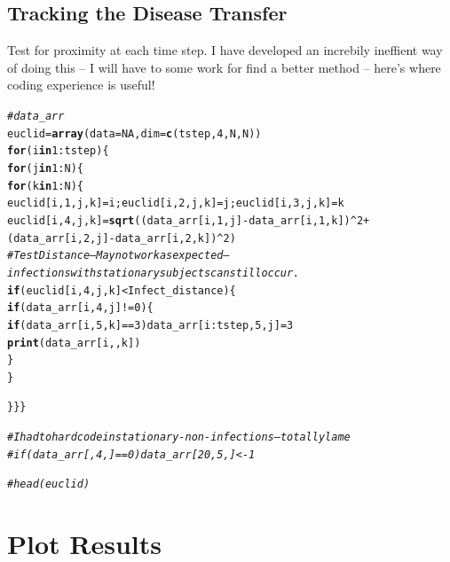 \documentclass{article}\usepackage[]{graphicx}\usepackage[]{color}
\makeatletter
\newcommand{\hlnum}[1]{\textcolor[rgb]{0.686,0.059,0.569}{#1}}%
\newcommand{\hlcom}[1]{\textcolor[rgb]{0.678,0.584,0.686}{\textit{#1}}}%
\newcommand{\hlopt}[1]{\textcolor[rgb]{0,0,0}{#1}}%
\newcommand{\hlstd}[1]{\textcolor[rgb]{0.345,0.345,0.345}{#1}}%
\newcommand{\hlkwa}[1]{\textcolor[rgb]{0.161,0.373,0.58}{\textbf{#1}}}%
\newcommand{\hlkwb}[1]{\textcolor[rgb]{0.69,0.353,0.396}{#1}}%
\newcommand{\hlkwc}[1]{\textcolor[rgb]{0.333,0.667,0.333}{#1}}%
\newcommand{\hlkwd}[1]{\textcolor[rgb]{0.737,0.353,0.396}{\textbf{#1}}}%
\newenvironment{kframe}{%
 \def\at@end@of@kframe{}%
 \ifinner\ifhmode%
  \def\at@end@of@kframe{\end{minipage}}%
  \begin{minipage}{\columnwidth}%
 \fi\fi%
 \def\FrameCommand##1{\hskip\@totalleftmargin \hskip-\fboxsep
 \colorbox{shadecolor}{##1}\hskip-\fboxsep
     \hskip-\linewidth \hskip-\@totalleftmargin \hskip\columnwidth}%
 \MakeFramed {\advance\hsize-\width
   \@totalleftmargin\z@ \linewidth\hsize
   \@setminipage}}%
 {\par\unskip\endMakeFramed%
 \at@end@of@kframe}
\newenvironment{knitrout}{}{} %
\makeatother
\begin{document}
\subsection{Tracking the Disease Transfer}

Test for proximity at each time step. I have developed an increbily ineffient way of doing this -- I will have to some work for find a better method -- here's where coding experience is useful!

\begin{knitrout}
\color{fgcolor}\begin{kframe}
\begin{alltt}
\hlcom{# data_arr}
\hlstd{euclid} \hlkwb{=} \hlkwd{array}\hlstd{(}\hlkwc{data}\hlstd{=}\hlnum{NA}\hlstd{,} \hlkwc{dim}\hlstd{=}\hlkwd{c}\hlstd{(tstep,} \hlnum{4}\hlstd{, N, N))}
\hlkwa{for}\hlstd{(i} \hlkwa{in} \hlnum{1}\hlopt{:}\hlstd{tstep)\{}
\hlkwa{for}\hlstd{(j} \hlkwa{in} \hlnum{1}\hlopt{:}\hlstd{N)\{}
\hlkwa{for}\hlstd{(k} \hlkwa{in} \hlnum{1}\hlopt{:}\hlstd{N)\{}
\hlstd{euclid[i,}\hlnum{1}\hlstd{,j,k]}\hlkwb{=}\hlstd{i; euclid[i,}\hlnum{2}\hlstd{,j,k]}\hlkwb{=}\hlstd{j; euclid[i,} \hlnum{3}\hlstd{, j,k]}\hlkwb{=}\hlstd{k}
\hlstd{euclid[i,}\hlnum{4}\hlstd{,j,k]} \hlkwb{=} \hlkwd{sqrt}\hlstd{((data_arr[i,}\hlnum{1}\hlstd{,j]}\hlopt{-}\hlstd{data_arr[i,} \hlnum{1}\hlstd{, k])}\hlopt{^}\hlnum{2}\hlopt{+}\hlstd{(data_arr[i,}\hlnum{2}\hlstd{,j]}\hlopt{-}\hlstd{data_arr[i,} \hlnum{2}\hlstd{,k])}\hlopt{^}\hlnum{2}\hlstd{)}
\hlcom{# Test Distance -- May not work as expected -- infections with stationary subjects can still occur.}
\hlkwa{if}\hlstd{(euclid[i,}\hlnum{4}\hlstd{,j,k]} \hlopt{<} \hlstd{Infect_distance)\{}
  \hlkwa{if}\hlstd{(data_arr[i,}\hlnum{4}\hlstd{,j]} \hlopt{!=} \hlnum{0}\hlstd{)\{}
    \hlkwa{if}\hlstd{(data_arr[i,}\hlnum{5}\hlstd{,k]} \hlopt{==} \hlnum{3}\hlstd{) data_arr[i}\hlopt{:}\hlstd{tstep,}\hlnum{5}\hlstd{,j]}\hlkwb{=}\hlnum{3}
    \hlkwd{print}\hlstd{(data_arr[i,,k])}
  \hlstd{\}}
\hlstd{\}}

\hlstd{\}\}\}}

\hlcom{# I had to hard code in stationary - non-infections -- totally lame}
\hlcom{#if(data_arr[,4,] == 0) data_arr[20,5,] <-1}

\hlcom{# head(euclid)}
\end{alltt}
\end{kframe}
\end{knitrout}

\section{Plot Results}
\end{document}
